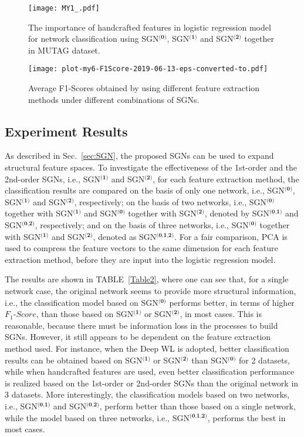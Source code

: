 \documentclass[10pt,journal,compsoc]{IEEEtran}
\begin{document}
\begin{figure*}[!t]
  \centering
  \texttt{[image: MY1\_.pdf]}
  \caption{The importance of handcrafted features in logistic regression model for network classification using SGN$^{\textbf{(0)}}$, SGN$^{\textbf{(1)}}$ and SGN$^{\textbf{(2)}}$ together in MUTAG dataset.}
  \label{featureout}
\end{figure*}

\begin{figure*}[!t]
  \centering
  \texttt{[image: plot-my6-F1Score-2019-06-13-eps-converted-to.pdf]}
  \caption{Average F1-Scores obtained by using different feature extraction methods under different combinations of SGNs.}
  \label{fig:exps}
\end{figure*}


\subsection{Experiment Results}
As described in Sec.~\ref{sec:SGN}, the proposed SGNs can be used to expand structural feature spaces. To investigate the effectiveness of the 1st-order and the 2nd-order SGNs, i.e., SGN$^{\textbf{(1)}}$ and SGN$^{\textbf{(2)}}$, for each feature extraction method, the classification results are compared on the basis of only one network, i.e., SGN$^{\textbf{(0)}}$, SGN$^{\textbf{(1)}}$ and SGN$^{\textbf{(2)}}$, respectively; on the basis of two networks, i.e., SGN$^{\textbf{(0)}}$ together with SGN$^{\textbf{(1)}}$ and SGN$^{\textbf{(0)}}$ together with SGN$^{\textbf{(2)}}$, denoted by SGN$^{\textbf{(0,1)}}$ and SGN$^{\textbf{(0,2)}}$, respectively; and on the basis of three networks, i.e., SGN$^{\textbf{(0)}}$ together with SGN$^{\textbf{(1)}}$ and SGN$^{\textbf{(2)}}$, denoted as SGN$^{\textbf{(0,1,2)}}$. For a fair comparison, PCA is used to compress the feature vectors to the same dimension for each feature extraction method, before they are input into the logistic regression model.

The results are shown in TABLE~\ref{Table2}, where one can see that, for a single network case, the original network seems to provide more structural information, i.e., the classification model based on SGN$^{\textbf{(0)}}$ performs better, in terms of higher $F_1$-$Score$, than those based on SGN$^{\textbf{(1)}}$ or SGN$^{\textbf{(2)}}$, in most cases. This is reasonable, because there must be information loss in the processes to build SGNs. However, it still appears to be dependent on the feature extraction method used. For instance, when the Deep WL is adopted, better classification results can be obtained based on SGN$^{\textbf{(1)}}$ or SGN$^{\textbf{(2)}}$ than SGN$^{\textbf{(0)}}$ for 2 datasets, while when handcrafted features are used, even better classification performance is realized based on the 1st-order or 2nd-order SGNs than the original network in 3 datasets. More interestingly, the classification models based on two networks, i.e., SGN$^{\textbf{(0,1)}}$ and SGN$^{\textbf{(0,2)}}$, perform better than those based on a single network, while the model based on three networks, i.e., SGN$^{\textbf{(0,1,2)}}$, performs the best in most cases.
\end{document}
